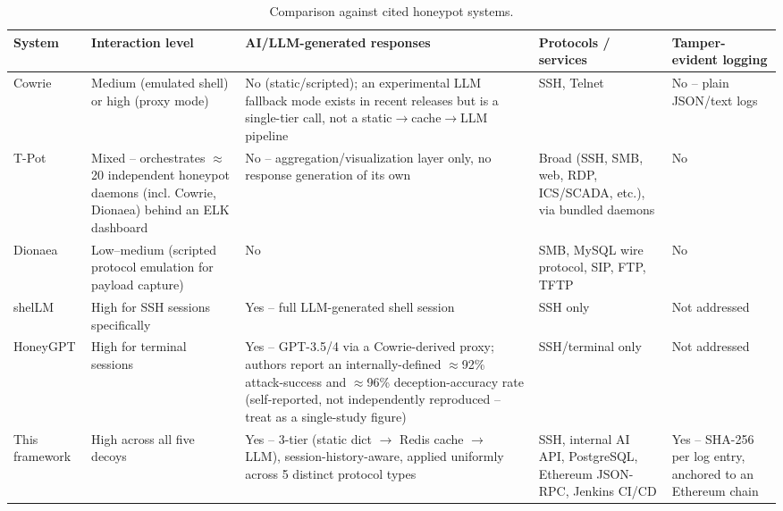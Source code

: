 \documentclass[conference]{IEEEtran}
\begin{document}
\begin{table}[htbp]
\caption{Comparison against cited honeypot systems.}
\label{tab:comparison}
\centering
\begin{tabular}{@{}p{2.1cm}p{2.6cm}p{4.6cm}p{2.6cm}p{2.6cm}@{}}
\toprule
\textbf{System} & \textbf{Interaction level} & \textbf{AI/LLM-generated responses} & \textbf{Protocols / services} & \textbf{Tamper-evident logging} \\
\midrule
Cowrie \cite{cowrie} & Medium (emulated shell) or high (proxy mode) & No (static/scripted); an experimental LLM fallback mode exists in recent releases but is a single-tier call, not a static$\to$cache$\to$LLM pipeline & SSH, Telnet & No -- plain JSON/text logs \\
T-Pot \cite{tpot} & Mixed -- orchestrates $\approx$20 independent honeypot daemons (incl. Cowrie, Dionaea) behind an ELK dashboard & No -- aggregation/visualization layer only, no response generation of its own & Broad (SSH, SMB, web, RDP, ICS/SCADA, etc.), via bundled daemons & No \\
Dionaea \cite{dionaea} & Low--medium (scripted protocol emulation for payload capture) & No & SMB, MySQL wire protocol, SIP, FTP, TFTP & No \\
shelLM \cite{sladic2024shellm} & High for SSH sessions specifically & Yes -- full LLM-generated shell session & SSH only & Not addressed \\
HoneyGPT \cite{wang2024honeygpt} & High for terminal sessions & Yes -- GPT-3.5/4 via a Cowrie-derived proxy; authors report an internally-defined $\approx$92\% attack-success and $\approx$96\% deception-accuracy rate (self-reported, not independently reproduced -- treat as a single-study figure) & SSH/terminal only & Not addressed \\
This framework & High across all five decoys & Yes -- 3-tier (static dict $\to$ Redis cache $\to$ LLM), session-history-aware, applied uniformly across 5 distinct protocol types & SSH, internal AI API, PostgreSQL, Ethereum JSON-RPC, Jenkins CI/CD & Yes -- SHA-256 per log entry, anchored to an Ethereum chain \\
\bottomrule
\end{tabular}
\end{table}
\end{document}
